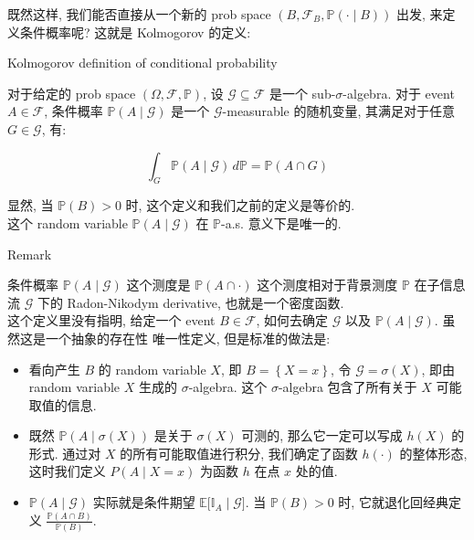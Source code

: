 \documentclass{qlnotes-export}
\begin{document}
既然这样, 我们能否直接从一个新的 prob space \((B,\mathcal{F}_{B},{\mathbb{P}}( \cdot \mid B))\) 出发, 来定义条件概率呢? 这就是 Kolmogorov 的定义:

\begin{definition}{Kolmogorov definition of conditional probability}\label{def-01-combinatorics-prob-space-kolmogorov-definition-of-conditional-probability}

对于给定的 prob space \((\Omega,\mathcal{F},{\mathbb{P}})\), 设 \(\mathcal{G} \subseteq \mathcal{F}\) 是一个 sub-\(\sigma\)-algebra. 对于 event \(A \in \mathcal{F}\), 条件概率 \({\mathbb{P}}(A \mid \mathcal{G})\) 是一个 \(\mathcal{G}\)-measurable 的随机变量, 其满足对于任意 \(G \in \mathcal{G}\), 有:

\[\int_{G}{\mathbb{P}}(A \mid \mathcal{G})\, d{\mathbb{P}} = {\mathbb{P}}(A \cap G)\]

显然, 当 \({\mathbb{P}}(B) > 0\) 时, 这个定义和我们之前的定义是等价的.\\
这个 random variable \({\mathbb{P}}(A \mid \mathcal{G})\) 在 \(\mathbb{P}\)-a.s. 意义下是唯一的.

\end{definition}

\begin{qlremark}{Remark}

条件概率 \({\mathbb{P}}(A \mid \mathcal{G})\) 这个测度是 \({\mathbb{P}}(A \cap \cdot )\) 这个测度相对于背景测度 \(\mathbb{P}\) 在子信息流 \(\mathcal{G}\) 下的 Radon-Nikodym derivative, 也就是一个密度函数.\\
这个定义里没有指明, 给定一个 event \(B \in \mathcal{F}\), 如何去确定 \(\mathcal{G}\) 以及 \({\mathbb{P}}(A \mid \mathcal{G})\). 虽然这是一个抽象的存在性{ } 唯一性定义, 但是标准的做法是:

\begin{itemize}
\item
  看向产生 \(B\) 的 random variable \(X\), 即 \(B = \left\{ {X = x} \right\}\), 令 \(\mathcal{G} = \sigma(X)\), 即由 random variable \(X\) 生成的 \(\sigma\)-algebra. 这个 \(\sigma\)-algebra 包含了所有关于 \(X\) 可能取值的信息.
\item
  既然 \({\mathbb{P}}(A \mid \sigma(X))\) 是关于 \(\sigma(X)\) 可测的, 那么它一定可以写成 \(h(X)\) 的形式. 通过对 \(X\) 的所有可能取值进行积分, 我们确定了函数 \(h( \cdot )\) 的整体形态, 这时我们定义 \(P(A \mid X = x)\) 为函数 \(h\) 在点 \(x\) 处的值.
\item
  \({\mathbb{P}}(A \mid \mathcal{G})\) 实际就是条件期望 \({\mathbb{E}}\lbrack{\mathbb{I}}_{A} \mid \mathcal{G}\rbrack\). 当 \({\mathbb{P}}(B) > 0\) 时, 它就退化回经典定义 \(\frac{{\mathbb{P}}(A \cap B)}{{\mathbb{P}}(B)}\).
\end{itemize}

\end{qlremark}
\end{document}
